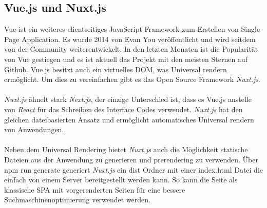 \documentclass[runningheads]{llncs}
\begin{document}
\subsection{Vue.js und Nuxt.js}
\label{subsec:Vue.js und Nuxt.js}
Vue ist ein weiteres clientseitiges JavaScript Framework 
zum Erstellen von Single Page Application. 
Es wurde 2014 von Evan You veröffentlicht und 
wird seitdem von der Community weiterentwickelt. 
In den letzten Monaten ist die Popularität von Vue gestiegen und 
es ist aktuell das Projekt mit den meisten Sternen auf Github. 
Vue.js besitzt auch ein virtuelles DOM, 
was Universal rendern ermöglicht. 
Um dies zu vereinfachen gibt es das Open Source Framework \textit{Nuxt.js}. \cite{vue.jsserver-sideguide}
\\
\\
\textit{Nuxt.js} ähnelt stark \textit{Next.js}, 
der einzige Unterschied ist, 
dass es Vue.js anstelle von \textit{React} für das Schreiben des Interface Codes verwendet. 
\textit{Nuxt.js} hat den gleichen dateibasierten Ansatz und ermöglicht automatisches Universal rendern von Anwendungen.
\\
\\
Neben dem Universal Rendering bietet \textit{Nuxt.js} auch die Möglichkeit statische Dateien aus der Anwendung zu generieren und 
prerendering zu verwenden.
Über npm run generate generiert \textit{Nuxt.js} ein dist Ordner mit einer index.html Datei 
die einfach von einem Server bereitgestellt werden kann. 
So kann die Seite als klassische SPA mit vorgerenderten Seiten für eine bessere Suchmaschinenoptimierung verwendet werden.
\end{document}
